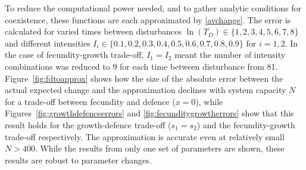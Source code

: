 \documentclass[a4paper]{article}
\begin{document}
  To reduce the computational power needed, and to gather analytic conditions for coexistence, these functions are each approximated by \eqref{avchange}. The error is calculated for varied times between disturbances $\ln(T_D) \in \{1,2,3,4,5,6,7,8\}$ and different intensities $I_i \in \{0.1,0.2,0.3,0.4,0.5,0.6,0.7,0.8,0.9\}$ for $i=1,2$. In the case of fecundity-growth trade-off, $I_1=I_2$ meant the number of intensity combinations was reduced to 9 for each time between disturbance from 81. Figure~\ref{fig:fdtoapprox} shows how the size of the absolute error between the actual expected change and the approximation declines with system capacity $N$ for a trade-off between fecundity and defence ($x=0$), while Figures~\ref{fig:growthdefenceerrors} and \ref{fig:fecunditygrowtherrors} show that this result holds for the growth-defence trade-off ($s_1=s_2$) and the fecundity-growth trade-off respectively. The approximation is accurate even at relatively small $N>400$. While the results from only one set of parameters are shown, these results are robust to parameter changes.
\end{document}
